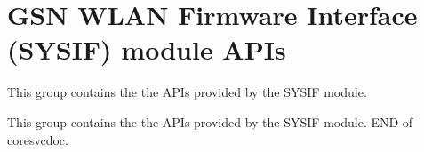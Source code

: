 \hypertarget{a00631}{
\section{GSN WLAN Firmware Interface (SYSIF) module APIs}
\label{a00631}
}


This group contains the the APIs provided by the SYSIF module.  


This group contains the the APIs provided by the SYSIF module. END of coresvcdoc. 
